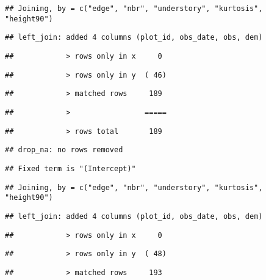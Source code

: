 \documentclass[
]{article}
\begin{document}
\begin{verbatim}
## Joining, by = c("edge", "nbr", "understory", "kurtosis", "height90")
\end{verbatim}

\begin{verbatim}
## left_join: added 4 columns (plot_id, obs_date, obs, dem)
\end{verbatim}

\begin{verbatim}
##            > rows only in x     0
\end{verbatim}

\begin{verbatim}
##            > rows only in y  ( 46)
\end{verbatim}

\begin{verbatim}
##            > matched rows     189
\end{verbatim}

\begin{verbatim}
##            >                 =====
\end{verbatim}

\begin{verbatim}
##            > rows total       189
\end{verbatim}

\begin{verbatim}
## drop_na: no rows removed
\end{verbatim}

\begin{verbatim}
## Fixed term is "(Intercept)"
\end{verbatim}

\begin{verbatim}
## Joining, by = c("edge", "nbr", "understory", "kurtosis", "height90")
\end{verbatim}

\begin{verbatim}
## left_join: added 4 columns (plot_id, obs_date, obs, dem)
\end{verbatim}

\begin{verbatim}
##            > rows only in x     0
\end{verbatim}

\begin{verbatim}
##            > rows only in y  ( 48)
\end{verbatim}

\begin{verbatim}
##            > matched rows     193
\end{verbatim}
\end{document}
